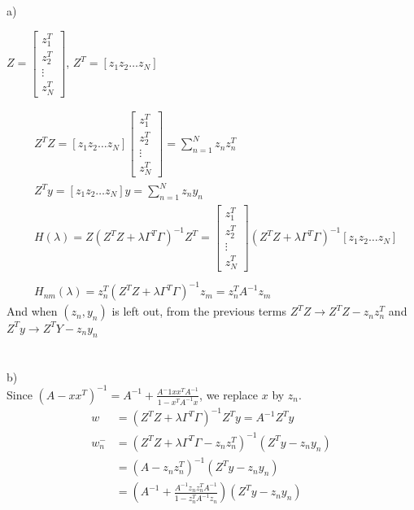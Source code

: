 \documentclass[12pt]{article}
\begin{document}
 \\\\
\indent a) \begin{center}$Z = \left[\begin{array}{c}z^T_1\\ z^T_2 \\\vdots\\z^T_N\end{array}\right]$, $Z^T = \left[z_1 z_2 \hdots z_N \right]$\end{center}
\begin{align*}
&Z^TZ = \left[z_1 z_2 \hdots z_N \right]  \left[\begin{array}{c}z^T_1\\ z^T_2 \\\vdots\\z^T_N\end{array}\right] = \sum_{n =1}^N z_n z_n^T\\
&Z^Ty = \left[z_1 z_2 \hdots z_N \right] y = \sum_{n =1}^N z_n y_n\\
&H(\lambda) = Z(Z^TZ+\lambda \Gamma^T \Gamma)^{-1}Z^T = \left[\begin{array}{c}z^T_1\\ z^T_2 \\\vdots\\z^T_N\end{array}\right] (Z^TZ + \lambda \Gamma^T \Gamma)^{-1}  \left[z_1 z_2 \hdots z_N \right]\\\\
&H_{nm}(\lambda) = z_n^T(Z^TZ + \lambda \Gamma^T \Gamma)^{-1}z_m = z_n^TA^{-1}z_m
 \end{align*}
 And when $(z_n,y_n)$ is left out, from the previous terms $Z^TZ \rightarrow Z^TZ - z_n z_n^T$ and $Z^Ty \rightarrow Z^TY - z_n y_n$\\\\\\
 \indent b) \\
 \indent Since $\displaystyle (A - x x^T)^{-1} = A^{-1} + \frac{A^-1x x^T A^{-1}}{1 - x^TA^{-1}x}$, we replace $x$ by $z_n$.
 \begin{align*} 
 \displaystyle
 w &= (Z^T Z + \lambda \Gamma^T \Gamma)^{-1}Z^T y = A^{-1}Z^T y\\
  w_n^- &= (Z^TZ + \lambda \Gamma^T \Gamma - z_n z_n^T)^{-1}(Z^T y - z_n y_n)\\
 &= (A - z_n z_n^T)^{-1}(Z^T y - z_ny_n)\\
   &= (A^{-1} + \frac{A^{-1}z_n z_n^T A^{-1}}{1 - z_n^TA^{-1}z_n})(Z^T y - z_n y_n)
 \end{align*}
\end{document}

